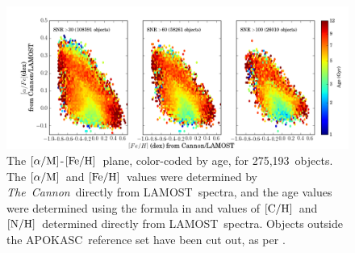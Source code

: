 \documentclass[12pt, preprint]{aastex}
\newcommand{\tc}{\textsl{The~Cannon}}
\newcommand{\apogee}{APOGEE}
\newcommand{\lamost}{LAMOST}
\newcommand{\apokasc}{APOKASC}
\newcommand{\mh}{\mbox{$\rm [M/H]$}}
\newcommand{\feh}{\mbox{$\rm [Fe/H]$}}
\newcommand{\alpham}{\mbox{$\rm [\alpha/M]$}}
\newcommand{\carbon}{\mbox{$\rm [C/H]$}}
\newcommand{\nitrogen}{\mbox{$\rm [N/H]$}}
\newcommand{\ntestobj}{275,193}
\begin{document}
\begin{figure}[ht!]
\centering
\includegraphics[scale=0.5]{feh_alpha_all.png}
\caption{
The \alpham-\feh\ plane, color-coded by age, 
for \ntestobj\ objects. The \alpham\ and \feh\ values
were determined by \tc\ directly from \lamost\ spectra,
and the age values were determined using the formula
in \citet{Martig2016} and values of \carbon\ and \nitrogen\ 
determined directly from \lamost\ spectra.
Objects outside the \apokasc\ reference set
have been cut out, as per \citet{Martig2016}.
}
\label{fig:feh-alpha}
\end{figure}



\end{document}
